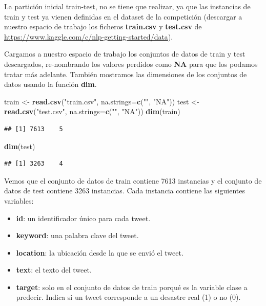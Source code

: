 \documentclass[]{article}
\newenvironment{Shaded}{\begin{snugshade}}{\end{snugshade}}
\newcommand{\DataTypeTok}[1]{\textcolor[rgb]{0.13,0.29,0.53}{#1}}
\newcommand{\KeywordTok}[1]{\textcolor[rgb]{0.13,0.29,0.53}{\textbf{#1}}}
\newcommand{\NormalTok}[1]{#1}
\newcommand{\StringTok}[1]{\textcolor[rgb]{0.31,0.60,0.02}{#1}}
\providecommand{\tightlist}{%
  \setlength{\itemsep}{0pt}\setlength{\parskip}{0pt}}
\begin{document}
La partición inicial train-test, no se tiene que realizar, ya que las
instancias de train y test ya vienen definidas en el dataset de la
competición (descargar a nuestro espacio de trabajo los ficheros
\textbf{train.csv} y \textbf{test.csv} de
\url{https://www.kaggle.com/c/nlp-getting-started/data}).

Cargamos a nuestro espacio de trabajo los conjuntos de datos de train y
test descargados, re-nombrando los valores perdidos como \textbf{NA} para
que los podamos tratar más adelante. También mostramos las dimensiones
de los conjuntos de datos usando la función \textbf{dim}.

\begin{Shaded}
\begin{Highlighting}[]
\NormalTok{train <-}\StringTok{ }\KeywordTok{read.csv}\NormalTok{(}\StringTok{"train.csv"}\NormalTok{, }\DataTypeTok{na.strings=}\KeywordTok{c}\NormalTok{(}\StringTok{""}\NormalTok{, }\StringTok{"NA"}\NormalTok{))}
\NormalTok{test <-}\StringTok{ }\KeywordTok{read.csv}\NormalTok{(}\StringTok{"test.csv"}\NormalTok{, }\DataTypeTok{na.strings=}\KeywordTok{c}\NormalTok{(}\StringTok{""}\NormalTok{, }\StringTok{"NA"}\NormalTok{))}
\KeywordTok{dim}\NormalTok{(train)}
\end{Highlighting}
\end{Shaded}

\begin{verbatim}
## [1] 7613    5
\end{verbatim}

\begin{Shaded}
\begin{Highlighting}[]
\KeywordTok{dim}\NormalTok{(test)}
\end{Highlighting}
\end{Shaded}

\begin{verbatim}
## [1] 3263    4
\end{verbatim}

Vemos que el conjunto de datos de train contiene 7613 instancias y el
conjunto de datos de test contiene 3263 instancias. Cada instancia
contiene las siguientes variables:

\begin{itemize}
\tightlist
\item
  \textbf{id}: un identificador único para cada tweet.
\item
  \textbf{keyword}: una palabra clave del tweet.
\item
  \textbf{location}: la ubicación desde la que se envió el tweet.
\item
  \textbf{text}: el texto del tweet.
\item
  \textbf{target}: solo en el conjunto de datos de train porqué es la
  variable clase a predecir. Indica si un tweet corresponde a un
  desastre real (1) o no (0).
\end{itemize}
\end{document}
